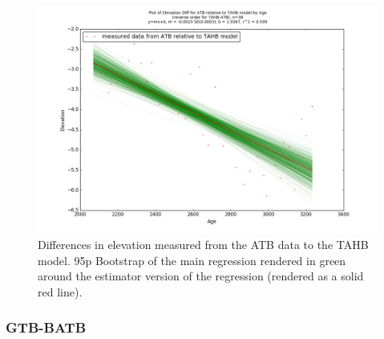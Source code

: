 \begin{figure}[H]
	\includegraphics[width=1.7\linewidth, angle=270 ]{data/bothNonZero/withinSeventyFivePercent/gias/theGIA_ATB_relative_to_TAHB.png}
	\caption{Differences in elevation measured from the ATB data to the TAHB model. 95p Bootstrap of the main regression rendered in green around the estimator version of the regression (rendered as a solid red line).}
	\label{fig:gias_ATBxTAHB}
\end{figure}
\newpage




\subsubsection{GTB-BATB}

